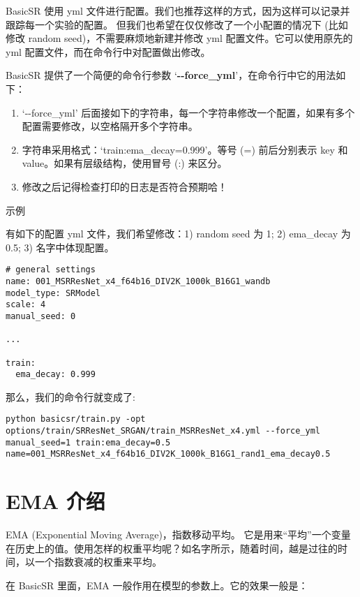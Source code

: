 \documentclass[../main.tex]{subfiles}
\begin{document}
BasicSR 使用 yml 文件进行配置。我们也推荐这样的方式，因为这样可以记录并跟踪每一个实验的配置。
但我们也希望在仅仅修改了一个小配置的情况下 (比如修改 random seed)，不需要麻烦地新建并修改 yml 配置文件。它可以使用原先的 yml 配置文件，而在命令行中对配置做出修改。

BasicSR 提供了一个简便的命令行参数 ‘\textbf{-{}-force\_yml}’，在命令行中它的用法如下：

\begin{enumerate}
	\item ‘-{}-force\_yml’ 后面接如下的字符串，每一个字符串修改一个配置，如果有多个配置需要修改，以空格隔开多个字符串。
	\item 字符串采用格式：‘train:ema\_decay=0.999’。等号 (=) 前后分别表示 key 和 value。如果有层级结构，使用冒号 (:) 来区分。
	\item 修改之后记得检查打印的日志是否符合预期哈！
\end{enumerate}

\begin{exampleBox}[]{示例}

	有如下的配置 yml 文件，我们希望修改：1) random seed 为 1; 2) ema\_decay 为0.5; 3) 名字中体现配置。

	\begin{verbatim}
# general settings
name: 001_MSRResNet_x4_f64b16_DIV2K_1000k_B16G1_wandb
model_type: SRModel
scale: 4
manual_seed: 0

...

train:
  ema_decay: 0.999
	\end{verbatim}

	那么，我们的命令行就变成了:
	\begin{verbatim}
python basicsr/train.py -opt options/train/SRResNet_SRGAN/train_MSRResNet_x4.yml --force_yml manual_seed=1 train:ema_decay=0.5 name=001_MSRResNet_x4_f64b16_DIV2K_1000k_B16G1_rand1_ema_decay0.5
	\end{verbatim}
\end{exampleBox}


\section{EMA 介绍}

EMA (Exponential Moving Average)，指数移动平均。
它是用来“平均”一个变量在历史上的值。使用怎样的权重平均呢？如名字所示，随着时间，越是过往的时间，以一个指数衰减的权重来平均。

在 BasicSR 里面，EMA 一般作用在模型的参数上。它的效果一般是：
\end{document}
